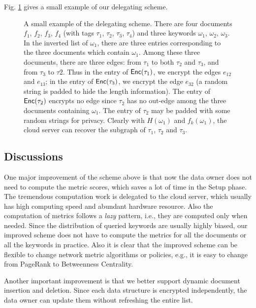 \documentclass{IEEEtran}
\begin{document}
Fig. \ref{fig:gl} gives a small example of our delegating scheme.

\begin{figure}[!t]
\centering
\begin{tikzpicture}[scale=.9]

\end{tikzpicture}
\caption{A small example of the delegating scheme. There are four documents $f_1$, $f_2$, $f_3$, $f_4$ (with tags $\tau_1$, $\tau_2$, $\tau_3$, $\tau_4$) and three keywords $\omega_1$, $\omega_2$, $\omega_3$. In the inverted list of $\omega_1$, there are three entries corresponding to the three documents which contain $\omega_1$. Among these three documents, there are three edges: from $\tau_1$ to both $\tau_2$ and $\tau_3$, and from $\tau_3$ to $\tau2$. Thus in the entry of $\Enc(\tau_1)$, we encrypt the edges $e_{12}$ and $e_{13}$; in the entry of $\Enc(\tau_3)$, we encrypt the edge $e_{32}$ (a random string is padded to hide the length information). The entry of $\Enc(\tau_2)$ encrypts no edge since $\tau_2$ has no out-edge among the three documents containing $\omega_1$. The entry of $\tau_2$ may be padded with some random strings for privacy. Clearly with $H(\omega_1)$ and $f_k(\omega_1)$, the cloud server can recover the subgraph of $\tau_1$, $\tau_2$ and $\tau_3$.}
\label{fig:gl}
\end{figure}

\subsection{Discussions}
One major improvement of the scheme above is that now the data owner does not need to compute the metric scores, which saves a lot of time in the Setup phase. The tremendous computation work is delegated to the cloud server, which usually has high computing speed and abundant hardware resource. Also the computation of metrics follows a \emph{lazy} pattern, i.e., they are computed only when needed. Since the distribution of queried keywords are usually highly biased, our improved scheme does not have to compute the metrics for all the documents or all the keywords in practice. Also it is clear that the improved scheme can be flexible to change network metric algorithms or policies, e.g., it is easy to change from PageRank to Betweenness Centrality.

Another important improvement is that we better support dynamic document insertion and deletion. Since each data structure is encrypted independently, the data owner can update them without refreshing the entire list.



\end{document}
